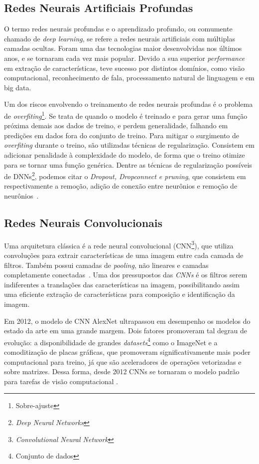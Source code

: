 \subsection{Redes Neurais Artificiais Profundas}\label{sec:Cap2_redes_neurais_profundas}
O termo redes neurais profundas e o aprendizado profundo, ou comumente chamado de \textit{deep learning}, se refere a redes neurais artificiais com múltiplas camadas ocultas. Foram uma das tecnologias maior desenvolvidas nos últimos anos, e se tornaram cada vez mais popular. Devido a sua superior \textit{performance} em extração de características, teve sucesso por distintos domínios, como visão computacional, reconhecimento de fala, processamento natural de linguagem e em big data.

Um dos riscos envolvendo o treinamento de redes neurais profundas é o problema de \textit{overfiting}\footnote{Sobre-ajuste}. Se trata de quando o modelo é treinado e para gerar uma função próxima demais aos dados de treino, e perdem generalidade, falhando em predições em dados fora do conjunto de treino. Para mitigar o surgimento de \textit{overfiting} durante o treino, são utilizadas técnicas de regularização. Consistem em adicionar penalidade à complexidade do modelo, de forma que o treino otimize para se tornar uma função genérica. Dentre as técnicas de regularização possíveis de DNNs\footnote{\textit{Deep Neural Networks}}, podemos citar o \textit{Dropout, Dropconnect e pruning}, que consistem em respectivamente a remoção, adição de conexão entre neurônios e remoção de neurônios~\cite{hastie01statisticallearning}.


\subsection{Redes Neurais Convolucionais}\label{sec:Cap2_redes_neurais_convolucionais}
Uma arquitetura clássica é a rede neural convolucional (CNN\footnote{\textit{Convolutional Neural Network}}), que utiliza convoluções para extrair características de uma imagem entre cada camada de filtros. Também possui camadas de \textit{pooling}, não lineares e camadas completamente conectadas~\cite{8308186}. Uma dos pressupostos das \textit{CNNs} é os filtros serem indiferentes a translações das características na imagem, possibilitando assim uma eficiente extração de características para composição e identificação da imagem.


Em 2012, o modelo de CNN AlexNet ultrapassou em desempenho os modelos do estado da arte em uma grande margem. Dois fatores promoveram tal degrau de evolução: a disponibilidade de grandes \textit{datasets}\footnote{Conjunto de dados} como o ImageNet e a comoditização de placas gráficas, que promoveram significativamente mais poder computacional para treino, já que são aceleradores de operações vetorizadas e sobre matrizes. Dessa forma, desde 2012 CNNs se tornaram o modelo padrão para tarefas de visão computacional \cite{alom2018history}.

